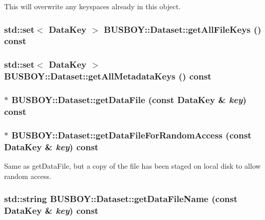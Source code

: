 This will overwrite any keyspaces already in this object. \hypertarget{classBUSBOY_1_1Dataset_a7d8ab5643693203998c8f7dafe66a7b1}{
\subsubsection[{getAllFileKeys}]{\setlength{\rightskip}{0pt plus 5cm}std::set$<$ {\bf DataKey} $>$ BUSBOY::Dataset::getAllFileKeys () const}}
\label{classBUSBOY_1_1Dataset_a7d8ab5643693203998c8f7dafe66a7b1}
\hypertarget{classBUSBOY_1_1Dataset_adc5ff7f63813f89976a67944697dc580}{
\subsubsection[{getAllMetadataKeys}]{\setlength{\rightskip}{0pt plus 5cm}std::set$<$ {\bf DataKey} $>$ BUSBOY::Dataset::getAllMetadataKeys () const}}
\label{classBUSBOY_1_1Dataset_adc5ff7f63813f89976a67944697dc580}
\hypertarget{classBUSBOY_1_1Dataset_ab30fc5affe15129e9bc79f1f612aedf9}{
\subsubsection[{getDataFile}]{ $\ast$ BUSBOY::Dataset::getDataFile (const {\bf DataKey} \& {\em key}) const}}
\label{classBUSBOY_1_1Dataset_ab30fc5affe15129e9bc79f1f612aedf9}
\hypertarget{classBUSBOY_1_1Dataset_aae5ce5b61453bd714ac6361e682d2d33}{
\subsubsection[{getDataFileForRandomAccess}]{ $\ast$ BUSBOY::Dataset::getDataFileForRandomAccess (const {\bf DataKey} \& {\em key}) const}}
\label{classBUSBOY_1_1Dataset_aae5ce5b61453bd714ac6361e682d2d33}


Same as getDataFile, but a copy of the file has been staged on local disk to allow random access. \hypertarget{classBUSBOY_1_1Dataset_a913b658402f4b86a06067447efaafbf5}{
\subsubsection[{getDataFileName}]{\setlength{\rightskip}{0pt plus 5cm}std::string BUSBOY::Dataset::getDataFileName (const {\bf DataKey} \& {\em key}) const}}
\label{classBUSBOY_1_1Dataset_a913b658402f4b86a06067447efaafbf5}


